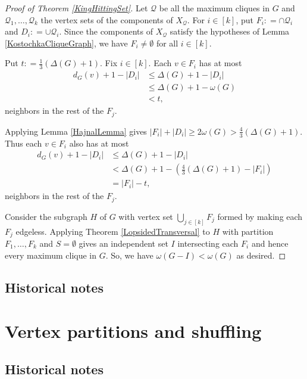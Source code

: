 \documentclass[openany]{tufte-book} %
\theoremstyle{plain}
\newcommand{\card}[1]{\left|#1\right|}
\newcommand{\irange}[1]{\left[#1\right]}
\newcommand{\parens}[1]{\left( #1 \right)}
\newcommand{\DefinedAs}{\mathrel{\mathop:}=}
\newcommand{\fancy}[1]{\mathcal{#1}}
\begin{document}
\begin{proof}[Proof of Theorem \ref{KingHittingSet}]
Let $\fancy{Q}$ be all the maximum cliques in $G$ and $\fancy{Q}_1, \ldots, \fancy{Q}_k$ the vertex 
sets of the components of $X_{\fancy{Q}}$.  For $i \in \irange{k}$, put $F_i \DefinedAs \cap \fancy{Q}_i$ and $D_i \DefinedAs \cup \fancy{Q}_i$.
Since the components of $X_{\fancy{Q}}$ satisfy the hypotheses of 
Lemma \ref{KostochkaCliqueGraph}, we have $F_i \ne \emptyset$ for all $i \in \irange{k}$.  

Put $t \DefinedAs \frac13(\Delta(G) + 1)$.  Fix $i \in \irange{k}$.  Each $v \in F_i$ has at most 
\begin{align*}
d_G(v) + 1 - \card{D_i} &\le \Delta(G) + 1 - \card{D_i}\\
&\le \Delta(G) + 1 - \omega(G)\\
&<t,
\end{align*}
neighbors in the rest of the $F_j$. 

Applying Lemma \ref{HajnalLemma} gives $\card{F_i} + \card{D_i} \ge 2\omega(G) > \frac{4}{3}(\Delta(G) + 1)$.  
Thus each $v \in F_i$ also has at most
\begin{align*}
d_G(v) + 1 - \card{D_i} &\le \Delta(G) + 1 - \card{D_i}\\
&< \Delta(G) + 1 - \parens{\frac{4}{3}(\Delta(G) + 1) - \card{F_i}}\\
&= \card{F_i} - t,
\end{align*}
neighbors in the rest of the $F_j$. 

Consider the subgraph $H$ of $G$ with vertex set $\bigcup_{j \in \irange{k}} F_j$ formed by making each $F_j$ edgeless. Applying Theorem \ref{LopsidedTransversal} to $H$ with 
partition $F_1, \ldots, F_k$ and $S = \emptyset$ gives an independent set $I$ intersecting each $F_i$ and hence every maximum clique in $G$.
So, we have $\omega(G - I) < \omega(G)$ as desired.
\end{proof}

\section{Historical notes}

\chapter{Vertex partitions and shuffling}
\section{Historical notes}
\end{document}
